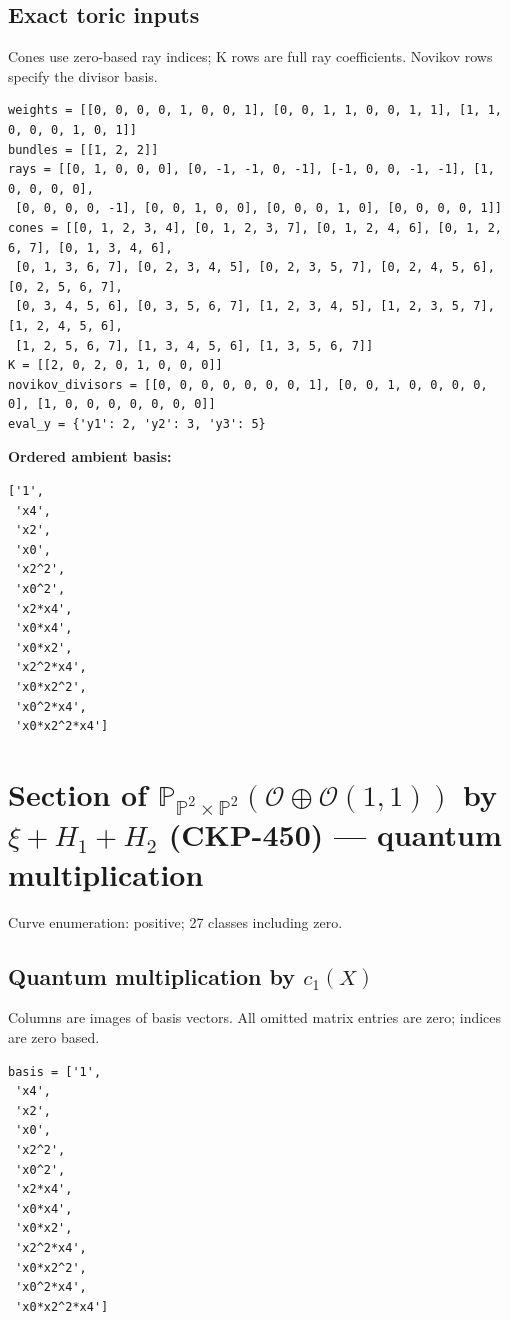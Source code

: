\documentclass[10pt,a4paper]{article}
\begin{document}
\subsection*{Exact toric inputs}
Cones use zero-based ray indices; K rows are full ray coefficients. Novikov rows specify the divisor basis.

\begin{lstlisting}
weights = [[0, 0, 0, 0, 1, 0, 0, 1], [0, 0, 1, 1, 0, 0, 1, 1], [1, 1, 0, 0, 0, 1, 0, 1]]
bundles = [[1, 2, 2]]
rays = [[0, 1, 0, 0, 0], [0, -1, -1, 0, -1], [-1, 0, 0, -1, -1], [1, 0, 0, 0, 0],
 [0, 0, 0, 0, -1], [0, 0, 1, 0, 0], [0, 0, 0, 1, 0], [0, 0, 0, 0, 1]]
cones = [[0, 1, 2, 3, 4], [0, 1, 2, 3, 7], [0, 1, 2, 4, 6], [0, 1, 2, 6, 7], [0, 1, 3, 4, 6],
 [0, 1, 3, 6, 7], [0, 2, 3, 4, 5], [0, 2, 3, 5, 7], [0, 2, 4, 5, 6], [0, 2, 5, 6, 7],
 [0, 3, 4, 5, 6], [0, 3, 5, 6, 7], [1, 2, 3, 4, 5], [1, 2, 3, 5, 7], [1, 2, 4, 5, 6],
 [1, 2, 5, 6, 7], [1, 3, 4, 5, 6], [1, 3, 5, 6, 7]]
K = [[2, 0, 2, 0, 1, 0, 0, 0]]
novikov_divisors = [[0, 0, 0, 0, 0, 0, 0, 1], [0, 0, 1, 0, 0, 0, 0, 0], [1, 0, 0, 0, 0, 0, 0, 0]]
eval_y = {'y1': 2, 'y2': 3, 'y3': 5}
\end{lstlisting}

\textbf{Ordered ambient basis:}
\begin{lstlisting}
['1',
 'x4',
 'x2',
 'x0',
 'x2^2',
 'x0^2',
 'x2*x4',
 'x0*x4',
 'x0*x2',
 'x2^2*x4',
 'x0*x2^2',
 'x0^2*x4',
 'x0*x2^2*x4']
\end{lstlisting}

\clearpage\section*{Section of $\mathbb P_{\mathbb P^{2}\times \mathbb P^{2}}(\mathcal O\oplus \mathcal O(1,1))$ by $\xi +H_{1}+H_{2}$ (CKP-450) --- quantum multiplication}

Curve enumeration: positive; 27 classes including zero.
\subsection*{Quantum multiplication by $c_1(X)$}
Columns are images of basis vectors. All omitted matrix entries are zero; indices are zero based.

\begin{lstlisting}
basis = ['1',
 'x4',
 'x2',
 'x0',
 'x2^2',
 'x0^2',
 'x2*x4',
 'x0*x4',
 'x0*x2',
 'x2^2*x4',
 'x0*x2^2',
 'x0^2*x4',
 'x0*x2^2*x4']
\end{lstlisting}
\end{document}
